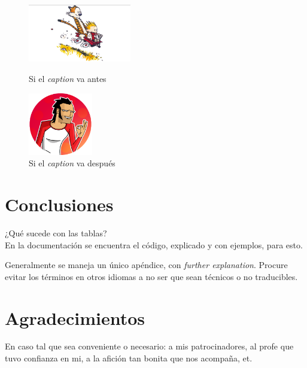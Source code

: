 \documentclass[journal]{IEEEtran}
\begin{document}
\begin{figure}
\caption{Si el \emph{caption} va antes}
\includegraphics[width=0.4\textwidth]{Imagenes/CandH1.jpg}
\label{fig:calvin1}
\end{figure}

\begin{figure}[h!]
\centering
\includegraphics[width=0.25\textwidth]{Imagenes/simon_circ.png}
\caption{Si el \emph{caption} va después}
\end{figure}

\section{Conclusiones}
¿Qué sucede con las tablas?\\
En la documentación se encuentra el código, explicado y con ejemplos, para esto.

Generalmente se maneja un único apéndice, con \emph{further explanation}. Procure evitar los términos en otros idiomas a no ser que sean técnicos o no traducibles.





\section*{Agradecimientos}
En caso tal que sea conveniente o necesario: a mis patrocinadores, al profe que tuvo confianza en mi, a la afición tan bonita que nos acompaña, et.
\ifCLASSOPTIONcaptionsoff
  \newpage
\fi

\end{document}
